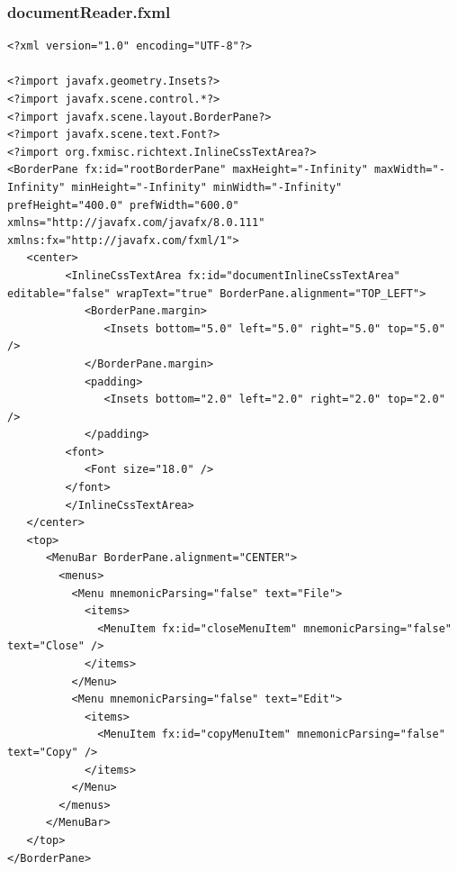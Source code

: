 \subsubsection{documentReader.fxml}
\begin{lstlisting}
<?xml version="1.0" encoding="UTF-8"?>

<?import javafx.geometry.Insets?>
<?import javafx.scene.control.*?>
<?import javafx.scene.layout.BorderPane?>
<?import javafx.scene.text.Font?>
<?import org.fxmisc.richtext.InlineCssTextArea?>
<BorderPane fx:id="rootBorderPane" maxHeight="-Infinity" maxWidth="-Infinity" minHeight="-Infinity" minWidth="-Infinity" prefHeight="400.0" prefWidth="600.0" xmlns="http://javafx.com/javafx/8.0.111" xmlns:fx="http://javafx.com/fxml/1">
   <center>
         <InlineCssTextArea fx:id="documentInlineCssTextArea" editable="false" wrapText="true" BorderPane.alignment="TOP_LEFT">
            <BorderPane.margin>
               <Insets bottom="5.0" left="5.0" right="5.0" top="5.0" />
            </BorderPane.margin>
            <padding>
               <Insets bottom="2.0" left="2.0" right="2.0" top="2.0" />
            </padding>
         <font>
            <Font size="18.0" />
         </font>
         </InlineCssTextArea>
   </center>
   <top>
      <MenuBar BorderPane.alignment="CENTER">
        <menus>
          <Menu mnemonicParsing="false" text="File">
            <items>
              <MenuItem fx:id="closeMenuItem" mnemonicParsing="false" text="Close" />
            </items>
          </Menu>
          <Menu mnemonicParsing="false" text="Edit">
            <items>
              <MenuItem fx:id="copyMenuItem" mnemonicParsing="false" text="Copy" />
            </items>
          </Menu>
        </menus>
      </MenuBar>
   </top>
</BorderPane>
\end{lstlisting}
